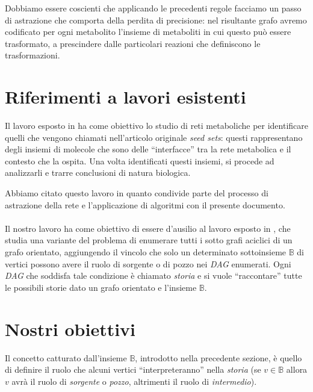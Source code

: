 Dobbiamo essere coscienti che applicando le precedenti regole facciamo
un passo di astrazione che comporta della perdita di precisione: nel
risultante grafo avremo codificato per ogni metabolito l'insieme di
metaboliti in cui questo pu\`o essere trasformato, a prescindere dalle
particolari reazioni che definiscono le trasformazioni.

\section{Riferimenti a lavori esistenti}
Il lavoro esposto in \cite{large-scale-reconstruction} ha come
obiettivo lo studio di reti metaboliche per identificare quelli che
vengono chiamati nell'articolo originale \emph{seed sets}: questi
rappresentano degli insiemi di molecole che sono delle ``interfacce''
tra la rete metabolica e il contesto che la ospita. Una volta
identificati questi insiemi, si procede ad analizzarli e trarre
conclusioni di natura biologica.

Abbiamo citato questo lavoro in quanto condivide parte del processo di
astrazione della rete e l'applicazione di algoritmi con il presente
documento.
\\\\
Il nostro lavoro ha come obiettivo di essere d'ausilio al lavoro
esposto in \cite{tellingStories}, che studia una variante del problema
di enumerare tutti i sotto grafi aciclici di un grafo orientato,
aggiungendo il vincolo che solo un determinato sottoinsieme
$\mathbb{B}$ di vertici possono avere il ruolo di sorgente o di pozzo
nei \emph{DAG} enumerati. Ogni \emph{DAG} che soddisfa tale condizione
\`e chiamato \emph{storia} e si vuole ``raccontare'' tutte le
possibili storie dato un grafo orientato e l'insieme $\mathbb{B}$.

\section{Nostri obiettivi}
Il concetto catturato dall'insieme $\mathbb{B}$, introdotto nella
precedente sezione, \`e quello di definire il ruolo che alcuni vertici
``interpreteranno'' nella \emph{storia} (se $v \in \mathbb{B}$ allora
$v$ avr\`a il ruolo di \emph{sorgente} o \emph{pozzo}, altrimenti il
ruolo di \emph{intermedio}).

